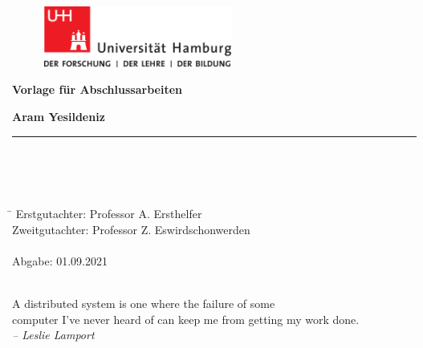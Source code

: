 \begin{titlepage}

  \setcounter{page}{-1}

	\begin{figure}[h]
		\begin{minipage}[b]{62mm}
			\includegraphics[width=62mm]{images/unilogo}
		\end{minipage}
		\hspace{4cm}
	\end{figure}

	\vfill
	
	\begin{center}
		\vspace{14mm}
		\noindent \textbf{\huge
		  Vorlage für Abschlussarbeiten
		}
		\vspace{60mm}	
	\end{center}
	
	\vfill
	
	\noindent \textbf{Aram Yesildeniz} \\
	\noindent \rule{\textwidth}{0.4mm} 
	 \\
	 \\
	 \\
	\begin{tabbing}
	\hspace{8em} \=  \kill
	Erstgutachter: \> Professor A. Ersthelfer \\
	Zweitgutachter: \> Professor Z. Eswirdschonwerden \\
	~ \\
	Abgabe: 01.09.2021
	\end{tabbing}
	
	\newpage 
	\thispagestyle{empty}
	\setcounter{page}{0}

	~\\ \vfill \noindent 
	A distributed system is one where the failure of some \\
	computer I've never heard of can keep me from getting my work done. \\
	\textit{-- Leslie Lamport}
\end{titlepage}

